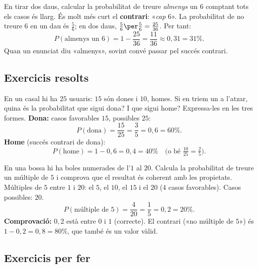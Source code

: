 \begin{exemple}
En tirar dos daus, calcular la probabilitat de treure \emph{almenys} un $6$ comptant
tots els casos és llarg. És molt més curt el \textbf{contrari}: «\emph{cap} $6$». La
probabilitat de no treure $6$ en un dau és $\frac{5}{6}$; en dos daus,
$\frac{5}{6}\per\frac{5}{6}=\frac{25}{36}$. Per tant:
\[
P(\text{almenys un 6})=1-\frac{25}{36}=\frac{11}{36}\approx 0,31=31\%.
\]
Quan un enunciat diu «almenys», sovint convé passar pel succés contrari.
\end{exemple}

\subsection{Exercicis resolts}

\begin{exresolt}
En un casal hi ha $25$ usuaris: $15$ són dones i $10$, homes. Si en triem un a l'atzar,
quina és la probabilitat que sigui dona? I que sigui home? Expressa-les en les tres
formes.
\solucio
\textbf{Dona:} casos favorables $15$, possibles $25$:
\[
P(\text{dona})=\frac{15}{25}=\frac{3}{5}=0,6=60\%.
\]
\textbf{Home} (succés contrari de dona):
\[
P(\text{home})=1-0,6=0,4=40\% \quad\Big(\text{o bé }\tfrac{10}{25}=\tfrac{2}{5}\Big).
\]
\end{exresolt}

\begin{exresolt}
En una bossa hi ha boles numerades de l'$1$ al $20$. Calcula la probabilitat de treure
un múltiple de $5$ i comprova que el resultat és coherent amb les propietats.
\solucio
Múltiples de $5$ entre $1$ i $20$: el $5$, el $10$, el $15$ i el $20$ ($4$ casos
favorables). Casos possibles: $20$.
\[
P(\text{múltiple de 5})=\frac{4}{20}=\frac{1}{5}=0,2=20\%.
\]
\textbf{Comprovació:} $0,2$ està entre $0$ i $1$ (correcte). El contrari («no múltiple de
$5$») és $1-0,2=0,8=80\%$, que també és un valor vàlid.
\end{exresolt}

\subsection{Exercicis per fer}

